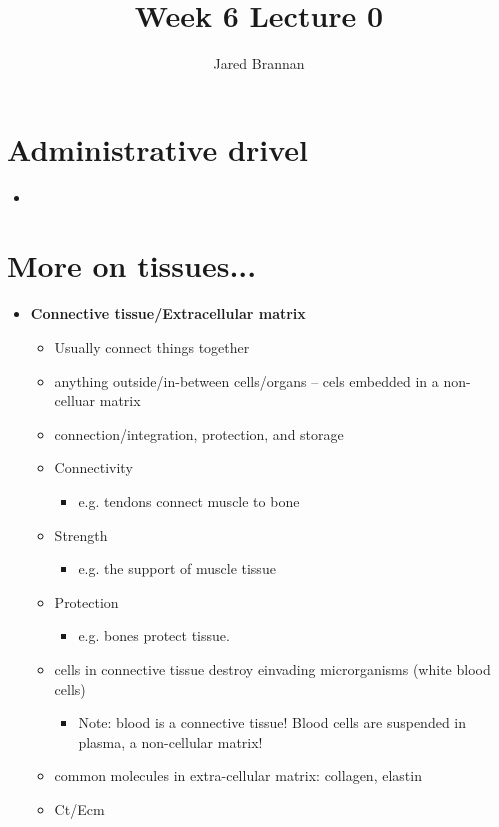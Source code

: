\documentclass{article}
\title{Week 6 Lecture 0}
\author{Jared Brannan }
\theoremstyle{definition}
\begin{document}
\maketitle

\section{Administrative drivel}
\begin{itemize}
	\item
\end{itemize}

\section{More on tissues...}
\begin{itemize}
	\item \textbf{Connective tissue/Extracellular matrix} 
		\begin{itemize}
			\item Usually connect things together
			\item anything outside/in-between cells/organs -- cels embedded in a non-celluar matrix
			\item connection/integration, protection, and storage
			\item Connectivity
				\begin{itemize}
					\item e.g. tendons connect muscle to bone
				\end{itemize}
			\item Strength
				\begin{itemize}
					\item e.g. the support of muscle tissue
				\end{itemize}
			\item Protection
				\begin{itemize}
					\item e.g. bones protect tissue.
				\end{itemize}
			\item cells in connective tissue destroy einvading microrganisms (white blood cells)
				\begin{itemize}
					\item Note: blood is a connective tissue! Blood cells are suspended in plasma, a non-cellular matrix!
				\end{itemize}
			\item common molecules in extra-cellular matrix: collagen, elastin
			\item Ct/Ecm

\end{itemize}
\end{itemize}
\end{document}
